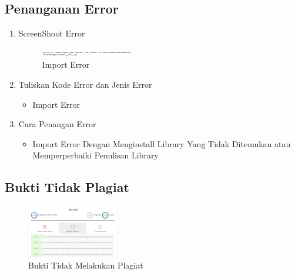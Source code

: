 \subsection{Penanganan Error}
\begin{enumerate}
	\item ScreenShoot Error
	\begin{figure}[H]
		\includegraphics[width=4cm]{figures/1174087/1/import.png}
		\centering
		\caption{Import Error}
	\end{figure}
	
	\item Tuliskan Kode Error dan Jenis Error
	\begin{itemize}
		\item Import Error
	\end{itemize}
	\item Cara Penangan Error
	\begin{itemize}
		\item Import Error
		\hfill\break
		Dengan Menginstall Library Yang Tidak Ditemukan atau Memperperbaiki Penulisan Library 
	
	\end{itemize}
\end{enumerate}

\subsection{Bukti Tidak Plagiat}
\begin{figure}[H]
	\includegraphics[width=4cm]{figures/1174087/1/plagiat.png}
	\centering
	\caption{Bukti Tidak Melakukan Plagiat}
\end{figure}